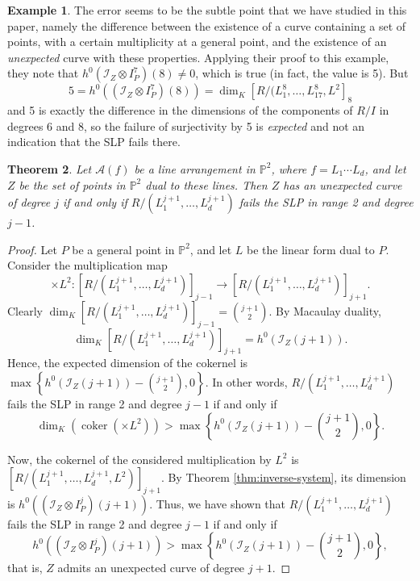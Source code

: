 \documentclass[12pt]{amsart}
\numberwithin{equation}{section}
\newtheorem{theorem}{Theorem}[section]
\theoremstyle{definition}
\newtheorem{example}[theorem]{Example}
\begin{document}
\begin{example}
The error seems to be the subtle point that we have studied in this paper, namely the difference between the existence of a curve containing a set of points, with a certain multiplicity at a general point, and the existence of an {\em unexpected} curve with these properties. Applying their proof to this example, they note that $h^0(\mathcal I_Z \otimes I_P^7)(8) \neq 0$, which is true (in fact, the value is 5). But 
\[
5 = h^0((\mathcal I_Z \otimes I_P^7)(8)) = \dim_K [R/(L_1^8,\dots,L_{17}^8,L^2]_8
\]
and 5 is exactly the difference in the dimensions of the components of $R/I$ in degrees 6 and 8, so the failure of surjectivity by 5 is {\em expected} and not an indication that the SLP fails there.
\end{example}

\begin{theorem} \label{SLP condition}
Let $\mathcal A(f)$ be a line arrangement in $\mathbb P^2$, where $f = L_1\cdots L_d$, and let $Z$ be the set of points in $\mathbb P^2$ dual to these lines.  Then $Z$ has an unexpected curve of degree $j$ if and only if $R/(L_1^{j+1},\dots,L_d^{j+1})$ fails the SLP in range 2 and degree $j-1$.
\end{theorem}

\begin{proof}
Let $P$ be a general point in $\mathbb P^2$, and let $L$ be the  linear form dual to $P$. Consider the multiplication map  
\[
\times L^2 : [R/(L_1^{j+1},\dots,L_d^{j+1})]_{j-1} \rightarrow [R/(L_1^{j+1},\dots,L_d^{j+1})]_{j+1}. 
\]
Clearly $\dim_K [R/(L_1^{j+1},\dots,L_d^{j+1})]_{j-1} = \binom{j+1}{2}$. By Macaulay duality, 
\[
\dim_K [R/(L_1^{j+1},\dots,L_d^{j+1})]_{j+1} = h^0(\mathcal I_Z(j+1)).
\]
Hence, the expected dimension of the cokernel is $\max \left \{ h^0(\mathcal I_Z(j+1)) - \binom{j+1}{2}, 0 \right \}$. In other words,  $R/(L_1^{j+1},\dots,L_d^{j+1})$ fails the SLP in range 2 and degree $j-1$ if and only if 
\[
\dim_K (\operatorname{coker} (\times L^2))  > \max \left \{ h^0(\mathcal I_Z(j+1)) - \binom{j+1}{2}, 0 \right \}.
\]

Now, the cokernel of the considered multiplication by $L^2$ is $[R/(L_1^{j+1},\dots,L_d^{j+1},L^2)]_{j+1}$. By Theorem \ref{thm:inverse-system}, its dimension is $h^0((\mathcal I_Z \otimes I_P^{j})(j+1))$. Thus, we have shown that 
$R/(L_1^{j+1},\dots,L_d^{j+1})$ fails the SLP in range 2 and degree $j-1$ if and only if 
\[
h^0((\mathcal I_Z \otimes I_P^{j})(j+1)) > \max \left \{ h^0(\mathcal I_Z(j+1)) - \binom{j+1}{2}, 0 \right \}, 
\]
that is, $Z$ admits an unexpected curve of degree $j+1$. 
\end{proof}
\end{document}
